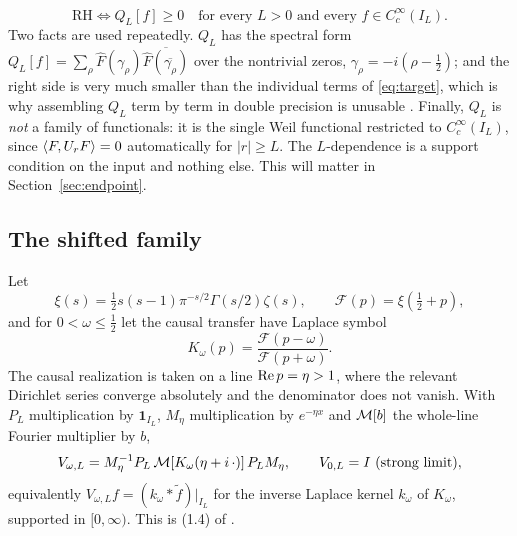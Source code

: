 \begin{equation}\label{eq:criterion}
 \mathrm{RH}\iff Q_L[f]\geq0\quad\text{for every }L>0
 \text{ and every }f\in C_c^\infty(I_L).
\end{equation}
Two facts are used repeatedly. $Q_L$ has the spectral form
$Q_L[f]=\sum_\rho\widehat F(\gamma_\rho)\overline{\widehat F(\overline{\gamma_\rho})}$
over the nontrivial zeros, $\gamma_\rho=-i(\rho-\frac12)$; and the right side is
very much smaller than the individual terms of \eqref{eq:target}, which is why
assembling $Q_L$ term by term in double precision is unusable
\cite{InverseBulk,Selection}. Finally, $Q_L$ is \emph{not} a family of
functionals: it is the single Weil functional restricted to $C_c^\infty(I_L)$,
since $\langle F,U_rF\rangle=0$ automatically for $|r|\geq L$. The $L$-dependence is a
support condition on the input and nothing else. This will matter in
Section~\ref{sec:endpoint}.

\subsection{The shifted family}

Let
\begin{equation}\label{eq:xi}
 \xi(s)=\tfrac12s(s-1)\pi^{-s/2}\Gamma(s/2)\zeta(s),\qquad
 \mathcal F(p)=\xi(\tfrac12+p),
\end{equation}
and for $0<\omega\leq\frac12$ let the causal transfer have Laplace symbol
\begin{equation}\label{eq:symbol}
 K_\omega(p)=\frac{\mathcal F(p-\omega)}{\mathcal F(p+\omega)} .
\end{equation}
The causal realization is taken on a line $\operatorname{Re} p=\eta>1$, where the relevant
Dirichlet series converge absolutely and the denominator does not vanish. With
$P_L$ multiplication by $\mathbf1_{I_L}$, $M_\eta$ multiplication by $e^{-\eta x}$
and $\mathcal M[b]$ the whole-line Fourier multiplier by $b$,
\begin{equation}\label{eq:transfer}
 V_{\omega,L}=M_\eta^{-1}P_L\,\mathcal M[K_\omega(\eta+i\,\cdot)]\,P_LM_\eta ,
 \qquad V_{0,L}=I\ \text{(strong limit)} ,
\end{equation}
equivalently $V_{\omega,L}f=(k_\omega*\widetilde f)|_{I_L}$ for the inverse
Laplace kernel $k_\omega$ of $K_\omega$, supported in $[0,\infty)$. This is
(1.4) of \cite{Background}.

